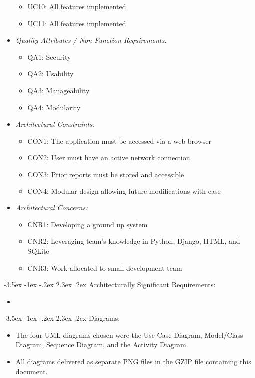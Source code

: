 \documentclass[11pt]{article}
\makeatletter
\renewcommand\section{\@startsection{section}{1}{\z@}%
                                  {-3.5ex \@plus -1ex \@minus -.2ex}%
                                  {2.3ex \@plus.2ex}%
                                  {\normalfont\large\bfseries}}
\renewcommand\section{\@startsection{section}{1}{\z@}%
                                  {-3.5ex \@plus -1ex \@minus -.2ex}%
                                  {2.3ex \@plus.2ex}%
                                  {\normalfont\large\bfseries}}
\makeatother
\begin{document}
\begin{itemize}
\begin{itemize}
                \item UC10: All features implemented
                \item UC11: All features implemented
            \end{itemize}
        \item \textit{Quality Attributes / Non-Function Requirements:}
            \begin{itemize}
                \item QA1: Security 
                \item QA2: Usability
                \item QA3: Manageability
                \item QA4: Modularity
            \end{itemize}
        \item \textit{Architectural Constraints:}
            \begin{itemize}
                \item CON1: The application must be accessed via a web browser
                \item CON2: User must have an active network connection
                \item CON3: Prior reports must be stored and accessible
                \item CON4: Modular design allowing future modifications with ease
            \end{itemize}
        \item \textit{Architectural Concerns:}
            \begin{itemize}
                \item CNR1: Developing a ground up system 
                \item CNR2: Leveraging team’s knowledge in Python, Django, HTML, and SQLite
                \item CNR3: Work allocated to small development team
            \end{itemize}
    \end{itemize}

\section{Architecturally Significant Requirements:}
    \begin{itemize}
        \item 
    \end{itemize}

\section{Diagrams:}
    \begin{itemize}
        \item The four UML diagrams chosen were the Use Case Diagram, Model/Class Diagram, Sequence Diagram, and the Activity Diagram.
        \item All diagrams delivered as separate PNG files in the GZIP file containing this document.
    \end{itemize}
            
\end{document}
